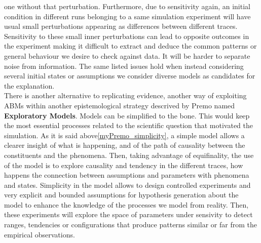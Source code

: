 \documentclass[11pt,oneside,a4paper,openright]{report}
\begin{document}
one without that perturbation. Furthermore, due to sensitivity again, an initial condition in different runs belonging to a same simulation experiment will have usual small perturbations appearing as differences between different traces. Sensitivity to these small inner perturbations can lead to opposite outcomes in the experiment making it difficult to extract and deduce the common patterns or general behaviour we desire to check against data. It will be harder to separate noise from information. The same listed issues hold when instead considering several initial states or assumptions we consider diverse models as candidates for the explanation.\\
%
%
%
% 
%
There is another alternative to replicating evidence, another way of exploiting ABMs within another epistemological strategy descrived by Premo \cite{Premo2010_EXPLOR} named \textbf{Exploratory Models}. Models can be simplified to the bone. This would keep the most essential processes related to the scientific question that motivated the simulation. As it is said above\ref{myPremo_simplicity}, a simple model allows a clearer insight of what is happening, and of the path of causality between the constituents and the phenomena. Then, taking advantage of equifinality, the use of the model is to explore causality and tendency in the different traces, how happens the connection between assumptions and parameters with phenomena and states. Simplicity in the model allows to design controlled experiments and very explicit and bounded assumptions for hypothesis generation about the model to enhance the knowledge of the processes we model from reality. Then, these experiments will explore the space of parameters under sensivity to detect ranges, tendencies or configurations that produce patterns similar or far from the empirical observations.\\ 
\end{document}
